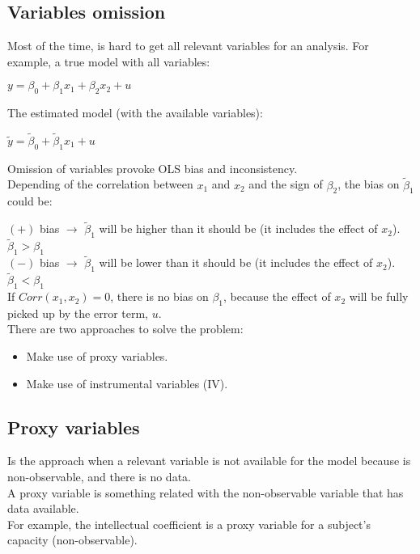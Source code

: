 \documentclass[10pt, a4paper, landscape]{extarticle}
\begin{document}
\begin{multicols}{3}
\columnbreak

\section*{Variables omission}
	Most of the time, is hard to get all relevant variables for an analysis. For example, a true model with all variables:
	\begin{center}
		$y = \beta_0 + \beta_1 x_1 + \beta_2 x_2 + u$
	\end{center}
	The estimated model (with the available variables):
	\begin{center}
		$\tilde{y} = \tilde{\beta}_0 + \tilde{\beta}_1 x_1 + u$
	\end{center}
	Omission of variables provoke OLS bias and inconsistency.
	\\ Depending of the correlation between $x_1$ and $x_2$ and the sign of $\beta_2$, the bias on $\tilde{\beta}_1$ could be:
	\begin{center}
	\end{center}
	$(+)$ bias $\rightarrow$ $\tilde{\beta}_1$ will be higher than it should be (it includes the effect of $x_2$). $\tilde{\beta}_1 > \beta_1$
	\\ $(-)$ bias $\rightarrow$ $\tilde{\beta}_1$ will be lower than it should be (it includes the effect of $x_2$). $\tilde{\beta}_1 < \beta_1$
	\\ If $Corr(x_1,x_2) = 0$, there is no bias on $\beta_1$, because the effect of $x_2$ will be fully picked up by the error term, $u$.
	\\ There are two approaches to solve the problem:
	\begin{itemize}[leftmargin=*]
		\item Make use of proxy variables.
		\item Make use of instrumental variables (IV).
	\end{itemize}
	\subsection*{Proxy variables}
		Is the approach when a relevant variable is not available for the model because is non-observable, and there is no data.
		\\ A proxy variable is something related with the non-observable variable that has data available.
		\\ For example, the intellectual coefficient is a proxy variable for a subject's capacity (non-observable).

\end{multicols}
\end{document}
